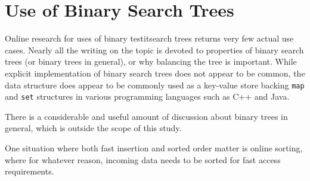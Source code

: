 
\section{Use of Binary Search Trees}

Online research for uses of binary testit{search} trees returns very few actual
use cases. Nearly all the writing on the topic is devoted to properties
of binary search trees (or binary trees in general), or why balancing the
tree is important. While explicit implementation of binary search trees does
not appear to be common, the data structure does appear to be commonly used
as a key-value store backing \texttt{map} and \texttt{set} structures
in various programming languages such as C++ and Java.

There is a considerable and useful amount of discussion
about binary trees in general, which is outside the scope
of this study.

One situation where both fast insertion and sorted order matter is
online sorting, where for whatever reason, incoming data needs to be
sorted for fast access requirements.


